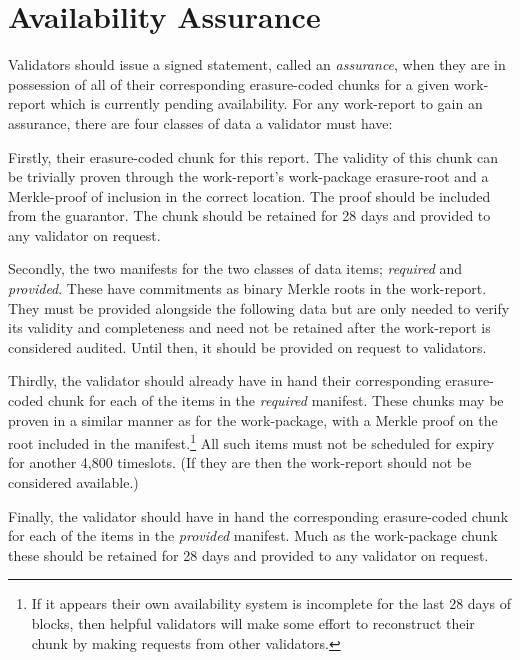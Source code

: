 \section{Availability Assurance}\label{sec:assurance}

Validators should issue a signed statement, called an \emph{assurance}, when they are in possession of all of their corresponding erasure-coded chunks for a given work-report which is currently pending availability. For any work-report to gain an assurance, there are four classes of data a validator must have:

Firstly, their erasure-coded chunk for this report. The validity of this chunk can be trivially proven through the work-report's work-package erasure-root and a Merkle-proof of inclusion in the correct location. The proof should be included from the guarantor. The chunk should be retained for 28 days and provided to any validator on request.

Secondly, the two manifests for the two classes of data items; \emph{required} and \emph{provided}. These have commitments as binary Merkle roots in the work-report. They must be provided alongside the following data but are only needed to verify its validity and completeness and need not be retained after the work-report is considered audited. Until then, it should be provided on request to validators.

Thirdly, the validator should already have in hand their corresponding erasure-coded chunk for each of the items in the \emph{required} manifest. These chunks may be proven in a similar manner as for the work-package, with a Merkle proof on the root included in the manifest.\footnote{If it appears their own availability system is incomplete for the last 28 days of blocks, then helpful validators will make some effort to reconstruct their chunk by making requests from other validators.} All such items must not be scheduled for expiry for another 4,800 timeslots. (If they are then the work-report should not be considered available.)

Finally, the validator should have in hand the corresponding erasure-coded chunk for each of the items in the \emph{provided} manifest. Much as the work-package chunk these should be retained for 28 days and provided to any validator on request.

